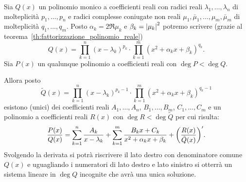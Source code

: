 \begin{theorem}
%
%
Sia $Q(x)$ un polinomio monico a coefficienti reali
con radici reali $\lambda_1, \dots, \lambda_n$ di molteplicità
$p_1, \dots, p_n$ e radici complesse coniugate non reali
$\mu_1, \bar \mu_1, \dots, \mu_m, \bar \mu_m$ di molteplicità
$q_1, \dots, q_m$. Posto $\alpha_k = 2\Re \mu_k$ e $\beta_k = {\left|\mu_k\right|}^2$
potremo scrivere (grazie al teorema~\ref{th:fattorizzazione_polinomio_reale})
\begin{equation}\label{eq:8845638}
  Q(x) = \prod_{k=1}^n (x-\lambda_k)^{p_k} \cdot \prod_{k=1}^m (x^2+ \alpha_k x + \beta_k)^{q_k}.
\end{equation}
Sia $P(x)$ un qualunque polinomio a coefficienti reali
con $\deg P < \deg Q$.

Allora posto
\[
 \tilde Q(x) = \prod_{k=1}^n (x-\lambda_k)^{p_k-1} \cdot \prod_{k=1}^m (x^2+\alpha_k x+\beta_k)^{q_k-1}
\]
esistono (unici) dei coefficienti reali
$A_1,\dots, A_n$, $B_1, \dots, B_m$, $C_1,\dots, C_m$
e un polinomio a coefficienti reali $R(x)$ con $\deg R < \deg \tilde Q$
per cui risulta:
\begin{equation}\label{eq:scomposizione_hermite}
  \frac{P(x)}{Q(x)} = \sum_{k=1}^n \frac{A_k}{x-\lambda_k}
  + \sum_{k=1}^m \frac{B_k x + C_k}{x^2+\alpha_k x + \beta_k}
  + {\left( \frac{R(x)}{\tilde Q(x)} \right)}'.
\end{equation}
Svolgendo la derivata si potrà
riscrivere il lato destro con denominatore comune $Q(x)$
e uguagliando i numeratori di lato destro e lato sinistro
si otterrà un sistema lineare in $\deg Q$ incognite
che avrà una unica soluzione.
\end{theorem}
%
